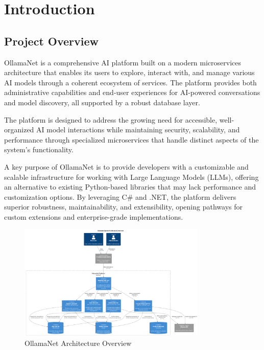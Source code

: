 \def\chapdir{./ChapterIntro}

\chapter{Introduction} \label{ch:intro}

\section{Project Overview}

OllamaNet is a comprehensive AI platform built on a modern microservices architecture that enables its users to explore, interact with, and manage various AI models through a coherent ecosystem of services. The platform provides both administrative capabilities and end-user experiences for AI-powered conversations and model discovery, all supported by a robust database layer.

The platform is designed to address the growing need for accessible, well-organized AI model interactions while maintaining security, scalability, and performance through specialized microservices that handle distinct aspects of the system's functionality.

A key purpose of OllamaNet is to provide developers with a customizable and scalable infrastructure for working with Large Language Models (LLMs), offering an alternative to existing Python-based libraries that may lack performance and customization options. By leveraging C\# and .NET, the platform delivers superior robustness, maintainability, and extensibility, opening pathways for custom extensions and enterprise-grade implementations.

\begin{figure}
    \centering
    \includegraphics[width=0.8\textwidth]{./Chapter01/figures/OllamaNet_System_Overview.png}
    \caption{OllamaNet Architecture Overview}
    \label{fig:ollamanet-architecture}
\end{figure}

